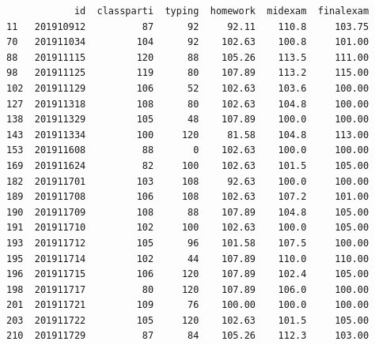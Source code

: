 \documentclass[a4paper,12pt]{article}
\begin{document}
\begin{enumerate}
\begin{enumerate}
\begin{verbatim}
            id  classparti  typing  homework  midexam  finalexam
11   201910912          87      92     92.11    110.8     103.75
70   201911034         104      92    102.63    100.8     101.00
88   201911115         120      88    105.26    113.5     111.00
98   201911125         119      80    107.89    113.2     115.00
102  201911129         106      52    102.63    103.6     100.00
127  201911318         108      80    102.63    104.8     100.00
138  201911329         105      48    107.89    100.0     100.00
143  201911334         100     120     81.58    104.8     113.00
153  201911608          88       0    102.63    100.0     100.00
169  201911624          82     100    102.63    101.5     105.00
182  201911701         103     108     92.63    100.0     100.00
189  201911708         106     108    102.63    107.2     101.00
190  201911709         108      88    107.89    104.8     105.00
191  201911710         102     100    102.63    100.0     105.00
193  201911712         105      96    101.58    107.5     100.00
195  201911714         102      44    107.89    110.0     110.00
196  201911715         106     120    107.89    102.4     105.00
198  201911717          80     120    107.89    106.0     100.00
201  201911721         109      76    100.00    100.0     100.00
203  201911722         105     120    102.63    101.5     105.00
210  201911729          87      84    105.26    112.3     103.00
\end{verbatim}
\end{enumerate}
\end{enumerate}
\end{document}
